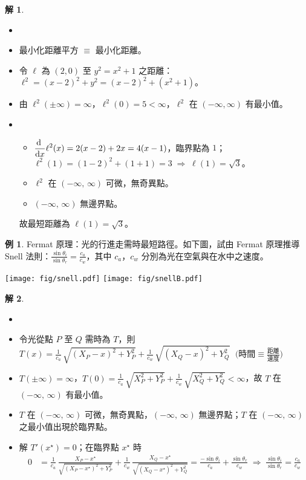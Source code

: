 \documentclass[12pt]{extarticle}
\newcommand{\ds}{\displaystyle}
\newcommand{\ie}{\;\Longrightarrow\;}
\newcommand{\diff}[2]{ \frac{\mathrm{d}\hfil#1\hfil}{\mathrm{d}#2}}
\theoremstyle{definition}
\newtheorem*{ex}{例}
\newtheorem*{sol}{解}
\begin{document}
\begin{sol}
  \begin{itemize}\setlength\itemsep{0em}
    \item[]
    \item 最小化距離平方 $\equiv$ 最小化距離。
    \item 令 $\ell$ 為 $(2, 0)$ 至 $y^2 = x^2 + 1$ 之距離：$\ds\ell^2 = (x - 2)^2 + y^2 = (x - 2)^2 + (x^2 + 1)$。
    \item 由 $\ds\ell^2(\pm\infty)=\infty$，$\ds\ell^2(0) = 5 < \infty$，$\ell^2$ 在 $(-\infty, \infty)$ 有最小值。
    \item 
      \begin{itemize}\setlength\itemsep{0em}
        \item $\ds\diff{}{x} \ell^2(x) = 2(x - 2) + 2x = 4(x - 1)$，臨界點為 $1$；$\ell^2(1) = (1 - 2)^2 + (1 + 1) = 3\ie \ell(1) = \sqrt{3}$。
        \item $\ell^2$ 在 $(-\infty,\,\infty)$ 可微，無奇異點。
        \item $(-\infty,\,\infty)$ 無邊界點。
      \end{itemize}
      故最短距離為 $\ell(1) = \sqrt{3}$。
    \end{itemize}
\end{sol}

\begin{ex}
  Fermat 原理：光的行進走需時最短路徑。如下圖，試由 Fermat 原理推導 Snell 法則：$\ds\frac{\sin\theta_i}{\sin\theta_r} = \frac{c_a}{c_w}$，其中 $c_a$，$c_w$ 分別為光在空氣與在水中之速度。
  \begin{center}
    \texttt{[image: fig/snell.pdf]}
    \texttt{[image: fig/snellB.pdf]}
  \end{center}
\end{ex}

\begin{sol}
  \begin{itemize}\setlength\itemsep{0em}
    \item[]
    \item 令光從點 $P$ 至 $Q$ 需時為 $T$，則 $\ds T(x) = \frac{1}{c_a}\,\sqrt{(X_P-x)^2+Y_P^2} + \frac{1}{c_w}\,\sqrt{(X_Q-x)^2+Y_Q^2}\;$ $\ds\Big(\text{時間}\equiv\frac{\text{距離}}{\text{速度}}\Big)$ 
    \item $\ds T(\pm\infty) = \infty$，$\ds T(0) = \frac{1}{c_a}\,\sqrt{X_P^2+Y_P^2} + \frac{1}{c_w}\,\sqrt{X_Q^2+Y_Q^2} < \infty$，故 $T$ 在 $(-\infty,\,\infty)$ 有最小值。
    \item $T$ 在 $(-\infty,\,\infty)$ 可微，無奇異點，$(-\infty,\,\infty)$ 無邊界點；$T$ 在 $(-\infty,\,\infty)$ 之最小值出現於臨界點。 
    \item 解 $\ds T'(x^\star) = 0$；在臨界點 $\ds x^\star$ 時
      \begin{align*}
        0 &= \frac{1}{c_a}\,\frac{X_P-x^\star}{\sqrt{(X_P-x^\star)^2+Y_P^2}} + \frac{1}{c_w}\,\frac{X_Q-x^\star}{\sqrt{(X_Q-x^\star)^2+Y_Q^2}} = \frac{-\sin\theta_i}{c_a} + \frac{\sin\theta_r}{c_w}\ie\frac{\sin\theta_i}{\sin\theta_r} = \frac{c_a}{c_w}
      \end{align*}
  \end{itemize}
\end{sol}
\end{document}

